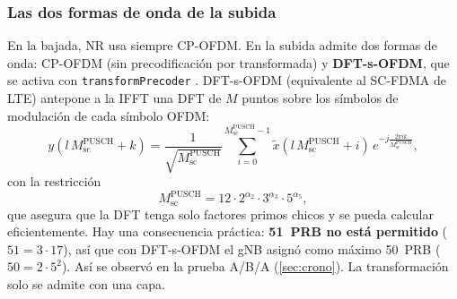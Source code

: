 \subsubsection{Las dos formas de onda de la subida}
En la bajada, NR usa siempre CP-OFDM. En la subida admite dos formas de onda: CP-OFDM (sin precodificación por transformada) y \textbf{DFT-s-OFDM}, que se activa con \texttt{transformPrecoder} \cite[§6.3.1.4]{ts38211}. DFT-s-OFDM (equivalente al SC-FDMA de LTE) antepone a la IFFT una DFT de $M$ puntos sobre los símbolos de modulación de cada símbolo OFDM:
\begin{equation}
y(l\,M_\text{sc}^\text{PUSCH} + k) = \frac{1}{\sqrt{M_\text{sc}^\text{PUSCH}}}\sum_{i=0}^{M_\text{sc}^\text{PUSCH}-1} \tilde{x}(l\,M_\text{sc}^\text{PUSCH}+i)\,e^{-j\frac{2\pi i k}{M_\text{sc}^\text{PUSCH}}},
\label{eq:transform}
\end{equation}
con la restricción \cite[§6.3.1.4]{ts38211}
\begin{equation}
M_\text{sc}^\text{PUSCH} = 12\cdot 2^{\alpha_2}\cdot 3^{\alpha_3}\cdot 5^{\alpha_5},
\label{eq:235}
\end{equation}
que asegura que la DFT tenga solo factores primos chicos y se pueda calcular eficientemente. Hay una consecuencia práctica: \textbf{51~PRB no está permitido} ($51 = 3\cdot 17$), así que con DFT-s-OFDM el gNB asignó como máximo 50~PRB ($50 = 2\cdot 5^2$). Así se observó en la prueba A/B/A (\cref{sec:crono}). La transformación solo se admite con una capa.

